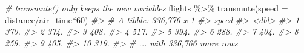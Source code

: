 \documentclass[
]{book}
\newenvironment{Shaded}{\begin{snugshade}}{\end{snugshade}}
\newcommand{\AttributeTok}[1]{\textcolor[rgb]{0.77,0.63,0.00}{#1}}
\newcommand{\CommentTok}[1]{\textcolor[rgb]{0.56,0.35,0.01}{\textit{#1}}}
\newcommand{\DecValTok}[1]{\textcolor[rgb]{0.00,0.00,0.81}{#1}}
\newcommand{\FunctionTok}[1]{\textcolor[rgb]{0.00,0.00,0.00}{#1}}
\newcommand{\NormalTok}[1]{#1}
\newcommand{\SpecialCharTok}[1]{\textcolor[rgb]{0.00,0.00,0.00}{#1}}
\begin{document}
\begin{Shaded}
\begin{Highlighting}[]
\CommentTok{\# transmute() only keeps the new variables}
\NormalTok{flights }\SpecialCharTok{\%\textgreater{}\%} \FunctionTok{transmute}\NormalTok{(}\AttributeTok{speed =}\NormalTok{ distance}\SpecialCharTok{/}\NormalTok{air\_time}\SpecialCharTok{*}\DecValTok{60}\NormalTok{)}
\CommentTok{\#\textgreater{} \# A tibble: 336,776 x 1}
\CommentTok{\#\textgreater{}    speed}
\CommentTok{\#\textgreater{}    \textless{}dbl\textgreater{}}
\CommentTok{\#\textgreater{}  1  370.}
\CommentTok{\#\textgreater{}  2  374.}
\CommentTok{\#\textgreater{}  3  408.}
\CommentTok{\#\textgreater{}  4  517.}
\CommentTok{\#\textgreater{}  5  394.}
\CommentTok{\#\textgreater{}  6  288.}
\CommentTok{\#\textgreater{}  7  404.}
\CommentTok{\#\textgreater{}  8  259.}
\CommentTok{\#\textgreater{}  9  405.}
\CommentTok{\#\textgreater{} 10  319.}
\CommentTok{\#\textgreater{} \# ... with 336,766 more rows}
\end{Highlighting}
\end{Shaded}
\end{document}
